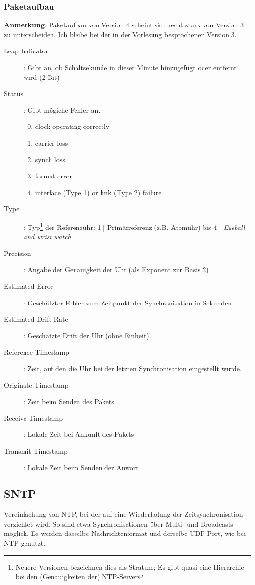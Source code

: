 \documentclass{article} %
\begin{document}
\subsubsection{Paketaufbau}
\textbf{Anmerkung}: Paketaufbau von Version 4 scheint sich recht stark von Version 3 zu unterscheiden.
Ich bleibe bei der in der Vorlesung besprochenen Version 3.
\begin{description}
	\item[Leap Indicator]: Gibt an, ob Schaltsekunde in dieser Minute hinzugefügt oder entfernt wird  (2 Bit)
	\item[Status]: Gibt mögiche Fehler an.
		\begin{enumerate}
			\setcounter{enumi}{-1}
			\item clock operating correctly
			\item carrier loss
			\item synch loss
			\item format error
			\item interface (Type 1) or link (Type 2) failure
		\end{enumerate}
	\item[Type]: Typ\footnote{Neuere Versionen bezeichnen dies als Stratum; Es gibt quasi eine Hierarchie bei den (Genauigkeiten der) NTP-Server} der Referenzuhr: 1 | Primärreferenz (z.B. Atomuhr) bis 4 | \emph{Eyeball and wrist watch}
	\item[Precision]: Angabe der Genauigkeit der Uhr (als Exponent zur Basis 2)
	\item[Estimated Error]: Geschätzter Fehler zum Zeitpunkt der Synchronisation in Sekunden.
	\item[Estimated Drift Rate]: Geschätzte Drift der Uhr (ohne Einheit).
	\item[Reference Timestamp]: Zeit, auf den die Uhr bei der letzten Synchronisation eingestellt
	wurde.
	\item[Originate Timestamp]: Zeit beim Senden des Pakets
	\item[Receive Timestamp]: Lokale Zeit bei Ankunft des Pakets
	\item[Transmit Timestamp]: Lokale Zeit beim Senden der Anwort
\end{description}

\subsection{SNTP}
Vereinfachung von NTP, bei der auf eine Wiederholung der Zeitsynchronisation verzichtet wird.
So sind etwa Synchronisationen über Multi- und Broadcasts möglich.
Es werden dasselbe Nachrichtenformat und derselbe UDP-Port, wie bei NTP genutzt\cite{rfc4330}.
\end{document}
